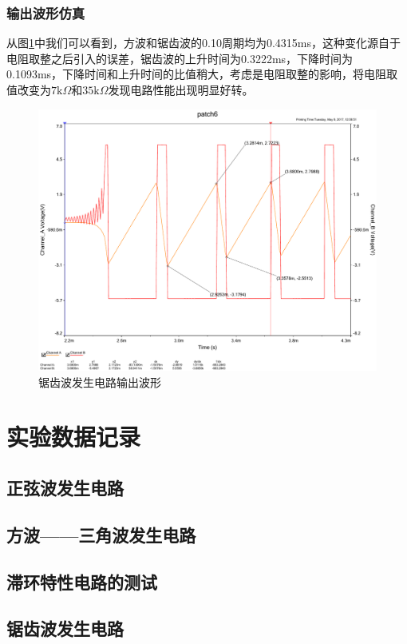 \documentclass[UTF8,a4paper]{paper}
\begin{document}
\subsubsection{输出波形仿真}
从图\ref{tan}中我们可以看到，方波和锯齿波的0.10周期均为0.4315ms，这种变化源自于电阻取整之后引入的误差，锯齿波的上升时间为0.3222ms，下降时间为0.1093ms，下降时间和上升时间的比值稍大，考虑是电阻取整的影响，将电阻取值改变为$7\mathrm{k}\Omega$和$35\mathrm{k}\Omega$发现电路性能出现明显好转。
\begin{figure}
\centering
\includegraphics[width=\textwidth]{tan.pdf}
\caption{锯齿波发生电路输出波形}
\label{tan}
\end{figure}
\section{实验数据记录}
\subsection{正弦波发生电路}
\subsection{方波——三角波发生电路}
\subsection{滞环特性电路的测试}
\subsection{锯齿波发生电路}
\end{document}
